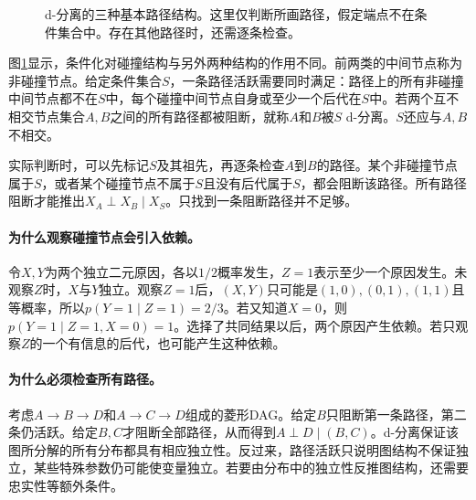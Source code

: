 \begin{figure}[htbp]
\centering
{}
\caption{d-分离的三种基本路径结构。这里仅判断所画路径，假定端点不在条件集合中。存在其他路径时，还需逐条检查。}
\label{fig:bayes-d-separation}
\end{figure}

图\ref{fig:bayes-d-separation}显示，条件化对碰撞结构与另外两种结构的作用不同。前两类的中间节点称为非碰撞节点。给定条件集合$S$，一条路径活跃需要同时满足：路径上的所有非碰撞中间节点都不在$S$中，每个碰撞中间节点自身或至少一个后代在$S$中。若两个互不相交节点集合$A,B$之间的所有路径都被阻断，就称$A$和$B$被$S$ d-分离。$S$还应与$A,B$不相交。

实际判断时，可以先标记$S$及其祖先，再逐条检查$A$到$B$的路径。某个非碰撞节点属于$S$，或者某个碰撞节点不属于$S$且没有后代属于$S$，都会阻断该路径。所有路径阻断才能推出$X_A\perp X_B\mid X_S$。只找到一条阻断路径并不足够。

\paragraph{为什么观察碰撞节点会引入依赖。}
令$X,Y$为两个独立二元原因，各以$1/2$概率发生，$Z=1$表示至少一个原因发生。未观察$Z$时，$X$与$Y$独立。观察$Z=1$后，$(X,Y)$只可能是$(1,0),(0,1),(1,1)$且等概率，所以$p(Y=1\mid Z=1)=2/3$。若又知道$X=0$，则$p(Y=1\mid Z=1,X=0)=1$。选择了共同结果以后，两个原因产生依赖。若只观察$Z$的一个有信息的后代，也可能产生这种依赖。

\paragraph{为什么必须检查所有路径。}
考虑$A\to B\to D$和$A\to C\to D$组成的菱形DAG。给定$B$只阻断第一条路径，第二条仍活跃。给定$B,C$才阻断全部路径，从而得到$A\perp D\mid(B,C)$。d-分离保证该图所分解的所有分布都具有相应独立性。反过来，路径活跃只说明图结构不保证独立，某些特殊参数仍可能使变量独立。若要由分布中的独立性反推图结构，还需要忠实性等额外条件。


